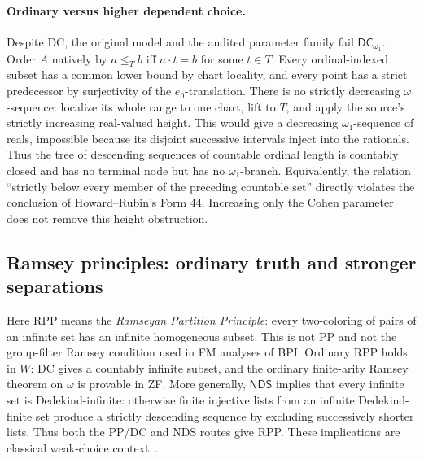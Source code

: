 \paragraph{Ordinary versus higher dependent choice.}
Despite DC, the original model and the audited parameter family fail
$\mathsf{DC}_{\omega_1}$. Order $A$ natively by
$a\leq_Tb$ iff $a\cdot t=b$ for some $t\in T$. Every ordinal-indexed
subset has a common lower bound by chart locality, and every point has
a strict predecessor by surjectivity of the $e_0$-translation.
There is no strictly decreasing $\omega_1$-sequence: localize its whole
range to one chart, lift to $T$, and apply the source's strictly
increasing real-valued height. This would give a decreasing
$\omega_1$-sequence of reals, impossible because its disjoint successive
intervals inject into the rationals. Thus the tree of descending
sequences of countable ordinal length is countably closed and has no
terminal node but has no $\omega_1$-branch. Equivalently, the relation
``strictly below every member of the preceding countable set'' directly
violates the conclusion of Howard--Rubin's Form 44.
Increasing only the Cohen parameter does not remove this height obstruction.

\subsection{Ramsey principles: ordinary truth and stronger separations}

Here RPP means the \emph{Ramseyan Partition Principle}: every two-coloring
of pairs of an infinite set has an infinite homogeneous subset. This is
not PP and not the group-filter Ramsey condition used in FM analyses of
BPI. Ordinary RPP holds in $W$: DC gives a countably infinite subset,
and the ordinary finite-arity Ramsey theorem on $\omega$ is provable in
ZF. More generally, $\mathsf{NDS}$ implies that every infinite set is
Dedekind-infinite: otherwise finite injective lists from an infinite
Dedekind-finite set produce a strictly descending sequence by excluding
successively shorter lists. Thus both the PP/DC and NDS routes give RPP.
These implications are classical weak-choice context~\cite{Blass1977,BK}.

